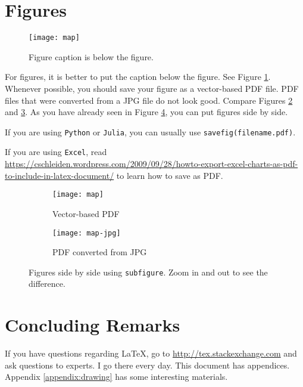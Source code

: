\documentclass[letterpaper, 11pt]{article}
\begin{document}
\section{Figures} \label{sec:figures}


\begin{figure} \centering
\texttt{[image: map]}
\caption{Figure caption is below the figure.}
\label{fig:map}
\end{figure}

For figures, it is better to put the caption below the figure.
See Figure \ref{fig:map}.
Whenever possible, you should save your figure as a vector-based PDF file.
PDF files that were converted from a JPG file do not look good.
Compare Figures \ref{fig:map-pdf} and \ref{fig:map-jpg}.
As you have already seen in Figure \ref{fig:side-by-side}, you can put figures side by side.

If you are using \texttt{Python} or \texttt{Julia}, you can usually use \texttt{savefig(filename.pdf)}.

If you are using \texttt{Excel}, read \url{https://cschleiden.wordpress.com/2009/09/28/howto-export-excel-charts-as-pdf-to-include-in-latex-document/} to learn how to save as PDF.



\begin{figure} \centering
\begin{subfigure}[b]{0.4\textwidth}
\texttt{[image: map]}
\caption{Vector-based PDF}
\label{fig:map-pdf}
\end{subfigure}
%
\begin{subfigure}[b]{0.4\textwidth}
\texttt{[image: map-jpg]}
\caption{PDF converted from JPG}
\label{fig:map-jpg}
\end{subfigure}
\caption{Figures side by side using \texttt{subfigure}. Zoom in and out to see the difference.}
\label{fig:side-by-side}
\end{figure}











\section{Concluding Remarks}

If you have questions regarding \LaTeX, go to \url{http://tex.stackexchange.com} and ask questions to experts.
I go there every day.
This document has appendices.
Appendix \ref{appendix:drawing} has some interesting materials.
\end{document}

